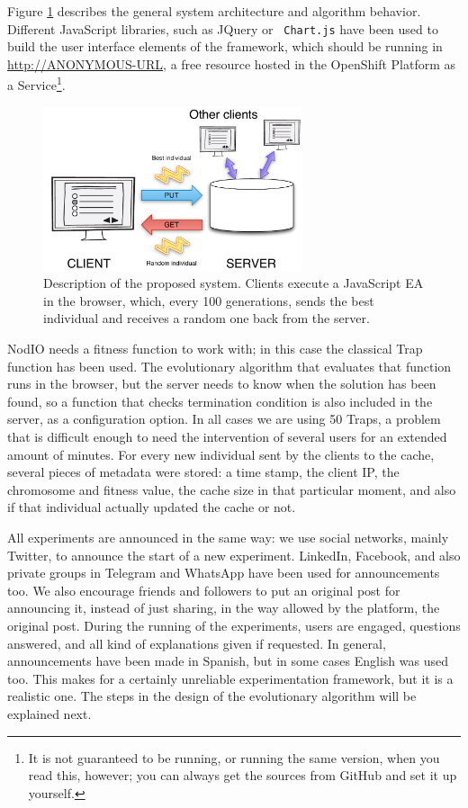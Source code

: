 \documentclass[runningheads,a4paper]{llncs}\usepackage[]{graphicx}\usepackage[]{color}
\begin{document}
Figure \ref{fig:system} describes the general system architecture and
algorithm behavior. Different JavaScript libraries, such as JQuery or {\tt
  Chart.js} have been used to build the user interface elements of the
framework, which should be running in \url{http://ANONYMOUS-URL}, 
a free resource hosted in the
OpenShift Platform as a Service\footnote{It is not guaranteed to be running,
or running the same version, when you read this, however; you can always get
the sources from GitHub and set it up yourself.}.
%
\begin{figure}[!t]
\centering
\includegraphics[width=3in]{system.pdf}
\caption{Description of the proposed system. Clients execute a JavaScript EA
  in the browser, which, every 100 generations, sends the best
  individual and receives a random one back from the server.}
\label{fig:system}
\end{figure}

NodIO needs a fitness function to work with; in this case the classical Trap 
function \cite{Ackley1987} has been used. %
The evolutionary algorithm that evaluates that function runs in the
browser, but the server needs to know when the solution has been
found, so a function that checks termination condition is also included in the server, as a configuration
option. In all cases we are using 50 Traps, a problem
that is difficult enough to need the intervention of several users for
an extended amount of minutes.
For every new individual sent by the clients to the cache, several
pieces of metadata were stored: a time stamp, the client IP, the chromosome and
fitness value, the cache size in that particular moment, and also if that
individual actually updated the cache or not. 

All experiments are announced in the same way: we use social networks,
mainly Twitter, to announce the start of a new experiment. LinkedIn,
Facebook, and also private groups in Telegram and WhatsApp have been
used for announcements too. We also encourage friends and followers to
put an original post for announcing it, instead of just sharing, in
the way allowed by the platform, the original post. During the running
of the experiments, users are engaged, questions answered, and all
kind of explanations given if requested. In general, announcements
have been made in Spanish, but in some cases English was used
too. This makes for a certainly unreliable experimentation framework,
but it is a realistic one. The steps in the design of the evolutionary
algorithm will be explained next.
\end{document}
